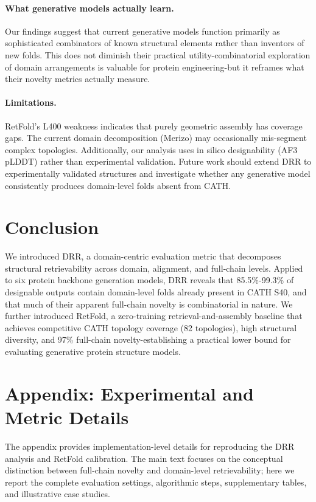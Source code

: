 \documentclass[letterpaper]{article} %
\begin{document}
\paragraph{What generative models actually learn.} Our findings suggest that current generative models function primarily as sophisticated combinators of known structural elements rather than inventors of new folds. This does not diminish their practical utility-combinatorial exploration of domain arrangements is valuable for protein engineering-but it reframes what their novelty metrics actually measure.

\paragraph{Limitations.} RetFold's L400 weakness indicates that purely geometric assembly has coverage gaps. The current domain decomposition (Merizo) may occasionally mis-segment complex topologies. Additionally, our analysis uses in silico designability (AF3 pLDDT) rather than experimental validation. Future work should extend DRR to experimentally validated structures and investigate whether any generative model consistently produces domain-level folds absent from CATH.

\section{Conclusion}

We introduced DRR, a domain-centric evaluation metric that decomposes structural retrievability across domain, alignment, and full-chain levels. Applied to six protein backbone generation models, DRR reveals that 85.5\%-99.3\% of designable outputs contain domain-level folds already present in CATH S40, and that much of their apparent full-chain novelty is combinatorial in nature. We further introduced RetFold, a zero-training retrieval-and-assembly baseline that achieves competitive CATH topology coverage (82 topologies), high structural diversity, and 97\% full-chain novelty-establishing a practical lower bound for evaluating generative protein structure models.



\appendix

\section{Appendix: Experimental and Metric Details}

The appendix provides implementation-level details for reproducing the DRR analysis and RetFold calibration. The main text focuses on the conceptual distinction between full-chain novelty and domain-level retrievability; here we report the complete evaluation settings, algorithmic steps, supplementary tables, and illustrative case studies.
\end{document}
